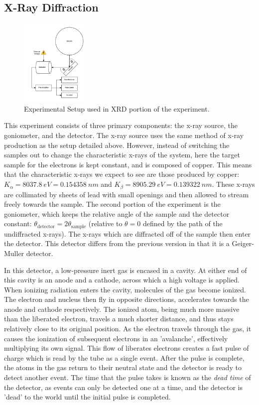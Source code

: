 \documentclass[%
 reprint,
 amsmath,amssymb,
 aps,
 pra,
]{revtex4-1}
\begin{document}
\subsection{X-Ray Diffraction}

\begin{figure}[H]
	\centering
	\includegraphics[width=0.3\textwidth]{xrd_experiment.png}
	\caption{Experimental Setup used in XRD portion of the experiment.}
	\label{fig:xrd_setup}
\end{figure}

This experiment consists of three primary components: the x-ray source, the goniometer, and the detector. The x-ray source uses the same method of x-ray production as the setup detailed above. However, instead of switching the samples out to change the characteristic x-rays of the system, here the target sample for the electrons is kept constant, and is composed of copper. This means that the characteristic x-rays we expect to see are those produced by copper: $K_\alpha = 8037.8 ~eV= 0.154358 ~nm$ and $K_\beta = 8905.29 ~eV = 0.139322 ~nm$. These x-rays are collimated by sheets of lead with small openings and then allowed to stream freely towards the sample. The second portion of the experiment is the goniometer, which keeps the relative angle of the sample and the detector constant: $\theta_{\text{detector}} = 2\theta_{\text{sample}}$ (relative to $\theta = 0$ defined by the path of the undiffracted x-rays). The x-rays which are diffracted off of the sample then enter the detector. This detector differs from the previous version in that it is a Geiger-Muller detector. 

In this detector, a low-pressure inert gas is encased in a cavity. At either end of this cavity is an anode and a cathode, across which a high voltage is applied. When ionizing radiation enters the cavity, molecules of the gas become ionized. The electron and nucleus then fly in opposite directions, accelerates towards the anode and cathode respectively. The ionized atom, being much more massive than the liberated electron, travels a much shorter distance, and thus stays relatively close to its original position.  As the electron travels through the gas, it causes the ionization of subsequent electrons in an 'avalanche', effectively multiplying its own signal. This flow of liberates electrons creates a fast pulse of charge which is read by the tube as a single event. After the pulse is complete, the atoms in the gas return to their neutral state and the detector is ready to detect another event. The time that the pulse takes is known as the \textit{dead time} of the detector, as events can only be detected one at a time, and the detector is 'dead' to the world until the initial pulse is completed. 
\end{document}
